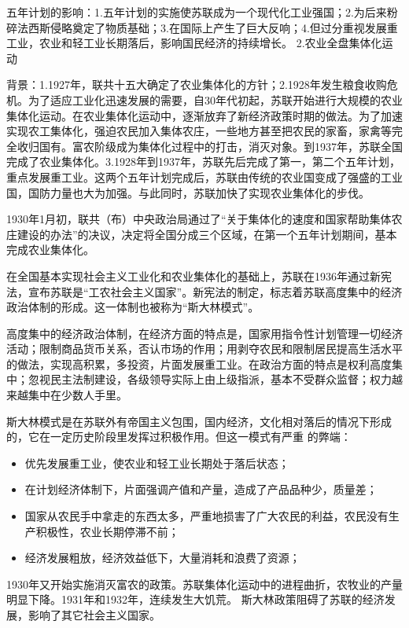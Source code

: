 五年计划的影响：1.五年计划的实施使苏联成为一个现代化工业强国；2.为后来粉碎法西斯侵略奠定了物质基础；3.在国际上产生了巨大反响；4.但过分重视发展重工业，农业和轻工业长期落后，影响国民经济的持续增长。
2.农业全盘集体化运动

背景：1.1927年，联共十五大确定了农业集体化的方针；2.1928年发生粮食收购危机。为了适应工业化迅速发展的需要，自30年代初起，苏联开始进行大规模的农业集体化运动。在农业集体化运动中，逐渐放弃了新经济政策时期的做法。为了加速实现农工集体化，强迫农民加入集体农庄，一些地方甚至把农民的家畜，家禽等完全收归国有。富农阶级成为集体化过程中的打击，消灭对象。到1937年，苏联全国完成了农业集体化。3.1928年到1937年，苏联先后完成了第一，第二个五年计划，重点发展重工业。这两个五年计划完成后，苏联由传统的农业国变成了强盛的工业国，国防力量也大为加强。与此同时，苏联加快了实现农业集体化的步伐。

1930年1月初，联共（布）中央政治局通过了“关于集体化的速度和国家帮助集体农庄建设的办法”的决议，决定将全国分成三个区域，在第一个五年计划期间，基本完成农业集体化。

在全国基本实现社会主义工业化和农业集体化的基础上，苏联在1936年通过新宪法，宣布苏联是“工农社会主义国家”。新宪法的制定，标志着苏联高度集中的经济政治体制的形成。这一体制也被称为“斯大林模式”。

高度集中的经济政治体制，在经济方面的特点是，国家用指令性计划管理一切经济活动；限制商品货币关系，否认市场的作用；用剥夺农民和限制居民提高生活水平的做法，实现高积累，多投资，片面发展重工业。在政治方面的特点是权利高度集中；忽视民主法制建设，各级领导实际上由上级指派，基本不受群众监督；权力越来越集中在少数人手里。

斯大林模式是在苏联外有帝国主义包围，国内经济，文化相对落后的情况下形成的，它在一定历史阶段里发挥过积极作用。但这一模式有严重 的弊端：

\begin{itemize}
    \item 优先发展重工业，使农业和轻工业长期处于落后状态；
    \item 在计划经济体制下，片面强调产值和产量，造成了产品品种少，质量差；
    \item 国家从农民手中拿走的东西太多，严重地损害了广大农民的利益，农民没有生产积极性，农业长期停滞不前；
    \item 经济发展粗放，经济效益低下，大量消耗和浪费了资源；
\end{itemize}

1930年又开始实施消灭富农的政策。苏联集体化运动中的进程曲折，农牧业的产量明显下降。1931年和1932年，连续发生大饥荒。
斯大林政策阻碍了苏联的经济发展，影响了其它社会主义国家。